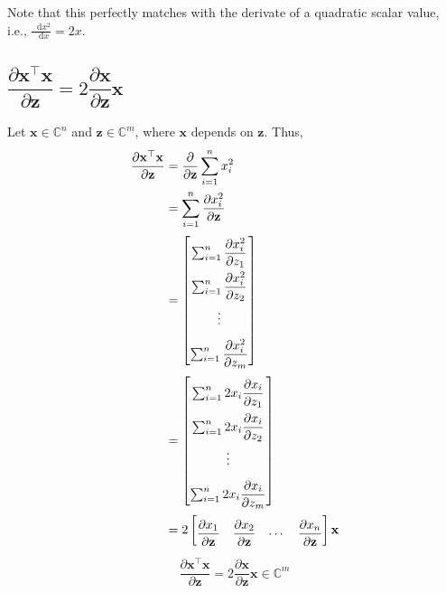 \documentclass{article}
\newcommand{\trans}{\top}
\newcommand*\diff{\mathop{}\!\mathrm{d}}
\begin{document}
Note that this perfectly matches with the derivate of a quadratic scalar value, i.e., \(\frac{\diff x^2}{\diff x} = 2x\).

\subsection{\(\dfrac{\partial \mathbf{x}^\trans \mathbf{x}}{\partial \mathbf{z}} = 2\dfrac{\partial \mathbf{x}}{\partial \mathbf{z}}\mathbf{x}\)}
Let \(\mathbf{x} \in \mathbb{C}^{n}\) and \(\mathbf{z}\in \mathbb{C}^m\), where \(\mathbf{x}\) depends on \(\mathbf{z}\). Thus,
\begin{align}
    \dfrac{\partial \mathbf{x}^\trans \mathbf{x}}{\partial \mathbf{z}} & = \dfrac{\partial}{\partial \mathbf{z}}\sum_{i=1}^{n} x_i^2 \\
    & = \sum_{i=1}^{n} \dfrac{\partial x_i^2}{\partial \mathbf{z}} \\
    & = \renewcommand{\arraystretch}{2.2}\begin{bmatrix}
        \sum_{i=1}^{n} \dfrac{\partial x_i^2}{\partial z_1} \\
        \sum_{i=1}^{n} \dfrac{\partial x_i^2}{\partial z_2} \\
        \vdots \\
        \sum_{i=1}^{n} \dfrac{\partial x_i^2}{\partial z_m} \\
    \end{bmatrix} \\
    & = \renewcommand{\arraystretch}{2.2}\begin{bmatrix}
        \sum_{i=1}^{n} 2x_i\dfrac{\partial x_i}{\partial z_1} \\
        \sum_{i=1}^{n} 2x_i\dfrac{\partial x_i}{\partial z_2} \\
        \vdots \\
        \sum_{i=1}^{n} 2x_i\dfrac{\partial x_i}{\partial z_m} \\
    \end{bmatrix} \\
    & = 2 \renewcommand{\arraystretch}{2.2}\begin{bmatrix}
        \dfrac{\partial x_1}{\partial \mathbf{z}} & \dfrac{\partial x_2}{\partial \mathbf{z}} & \cdots & \dfrac{\partial x_n}{\partial \mathbf{z}}
    \end{bmatrix} \mathbf{x}
\end{align}
\begin{align}
    \boxed{\dfrac{\partial \mathbf{x}^\trans \mathbf{x}}{\partial \mathbf{z}} = 2\dfrac{\partial \mathbf{x}}{\partial \mathbf{z}}\mathbf{x} \in \mathbb{C}^m}
\end{align}
\end{document}
